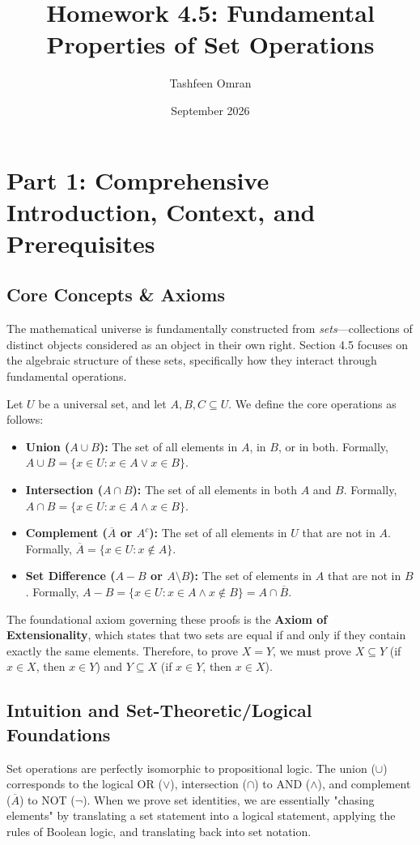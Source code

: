 \documentclass[11pt, a4paper]{article}
\title{Homework 4.5: Fundamental Properties of Set Operations}
\author{Tashfeen Omran}
\date{September 2026}
\theoremstyle{definition}
\theoremstyle{remark}
\begin{document}
\maketitle
\tableofcontents
\newpage

\section{Part 1: Comprehensive Introduction, Context, and Prerequisites}

\subsection{Core Concepts \& Axioms}
The mathematical universe is fundamentally constructed from \textit{sets}---collections of distinct objects considered as an object in their own right. Section 4.5 focuses on the algebraic structure of these sets, specifically how they interact through fundamental operations. 

Let $U$ be a universal set, and let $A, B, C \subseteq U$. We define the core operations as follows:
\begin{itemize}
    \item \textbf{Union ($A \cup B$):} The set of all elements in $A$, in $B$, or in both. Formally, $A \cup B = \{x \in U : x \in A \lor x \in B\}$.
    \item \textbf{Intersection ($A \cap B$):} The set of all elements in both $A$ and $B$. Formally, $A \cap B = \{x \in U : x \in A \land x \in B\}$.
    \item \textbf{Complement ($\overline{A}$ or $A^c$):} The set of all elements in $U$ that are not in $A$. Formally, $\overline{A} = \{x \in U : x \notin A\}$.
    \item \textbf{Set Difference ($A - B$ or $A \setminus B$):} The set of elements in $A$ that are not in $B$. Formally, $A - B = \{x \in U : x \in A \land x \notin B\} = A \cap \overline{B}$.
\end{itemize}

The foundational axiom governing these proofs is the \textbf{Axiom of Extensionality}, which states that two sets are equal if and only if they contain exactly the same elements. Therefore, to prove $X = Y$, we must prove $X \subseteq Y$ (if $x \in X$, then $x \in Y$) and $Y \subseteq X$ (if $x \in Y$, then $x \in X$).

\subsection{Intuition and Set-Theoretic/Logical Foundations}
Set operations are perfectly isomorphic to propositional logic. The union ($\cup$) corresponds to the logical OR ($\lor$), intersection ($\cap$) to AND ($\land$), and complement ($\overline{A}$) to NOT ($\neg$). When we prove set identities, we are essentially "chasing elements" by translating a set statement into a logical statement, applying the rules of Boolean logic, and translating back into set notation. 
\end{document}
